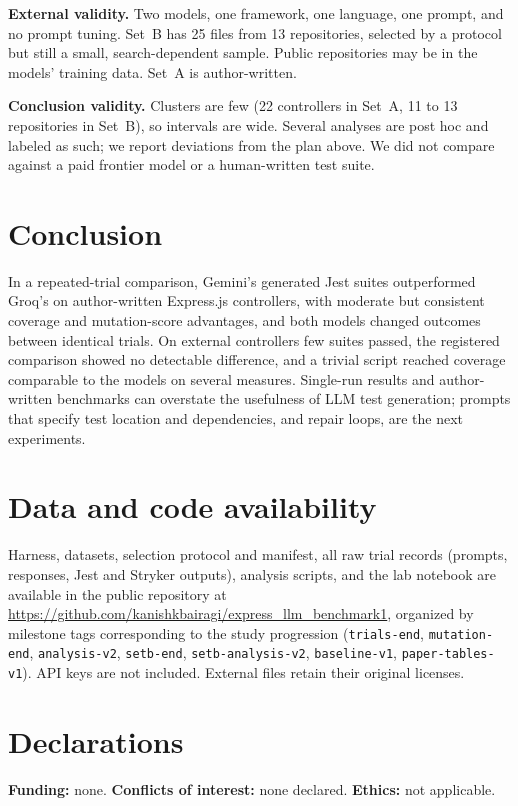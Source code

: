 \documentclass[11pt]{article}
\begin{document}
\textbf{External validity.} Two models, one framework, one language, one prompt, and no prompt tuning. Set~B has 25 files from 13 repositories, selected by a protocol but still a small, search-dependent sample. Public repositories may be in the models' training data. Set~A is author-written.

\textbf{Conclusion validity.} Clusters are few (22 controllers in Set~A, 11 to 13 repositories in Set~B), so intervals are wide. Several analyses are post hoc and labeled as such; we report deviations from the plan above. We did not compare against a paid frontier model or a human-written test suite.

\section{Conclusion}
In a repeated-trial comparison, Gemini's generated Jest suites outperformed Groq's on author-written Express.js controllers, with moderate but consistent coverage and mutation-score advantages, and both models changed outcomes between identical trials. On external controllers few suites passed, the registered comparison showed no detectable difference, and a trivial script reached coverage comparable to the models on several measures. Single-run results and author-written benchmarks can overstate the usefulness of LLM test generation; prompts that specify test location and dependencies, and repair loops, are the next experiments.

\section*{Data and code availability}
Harness, datasets, selection protocol and manifest, all raw trial records (prompts, responses, Jest and Stryker outputs), analysis scripts, and the lab notebook are available in the public repository at \url{https://github.com/kanishkbairagi/express_llm_benchmark1}, organized by milestone tags corresponding to the study progression (\texttt{trials-end}, \texttt{mutation-end}, \texttt{analysis-v2}, \texttt{setb-end}, \texttt{setb-analysis-v2}, \texttt{baseline-v1}, \texttt{paper-tables-v1}). API keys are not included. External files retain their original licenses.

\section*{Declarations}
\textbf{Funding:} none. \textbf{Conflicts of interest:} none declared. \textbf{Ethics:} not applicable.
\end{document}
